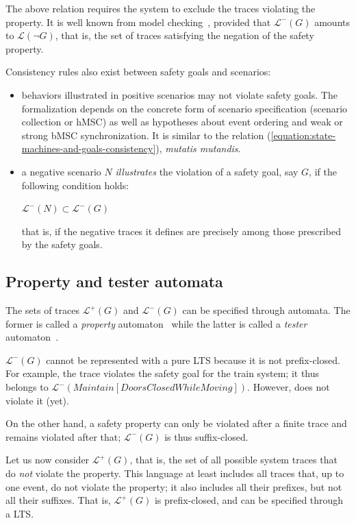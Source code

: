 The above relation requires the system to exclude the traces violating the property. It is well known from model checking~\cite{Clarke:1989}, provided that $\mathcal{L}^{-}(G)$ amounts to $\mathcal{L}(\neg G)$, that is, the set of traces satisfying the negation of the safety property. 

Consistency rules also exist between safety goals and scenarios:

\begin{itemize}
\item behaviors illustrated in positive scenarios may not violate safety goals. The formalization depends on the concrete form of scenario specification (scenario collection or hMSC) as well as hypotheses about event ordering and weak or strong bMSC synchronization. It is similar to the relation (\ref{equation:state-machines-and-goals-consistency}), \emph{mutatis mutandis}.
\item a negative scenario $N$ \emph{illustrates} the violation of a safety goal, say $G$, if the following condition holds:
\begin{center}
$\mathcal{L}^{-}(N) \subset \mathcal{L}^{-}(G)$
\end{center}
\noindent that is, if the negative traces it defines are precisely among those prescribed by the safety goals.
\end{itemize}

\subsection{Property and tester automata\label{subsection:background-property-and-tester-automata}}

The sets of traces $\mathcal{L}^{+}(G)$ and $\mathcal{L}^{-}(G)$ can be specified through automata. The former is called a \emph{property} automaton~\cite{Letier:2005, Letier:2008} while the latter is called a \emph{tester} automaton~\cite{Giannakopoulou:2003}.

$\mathcal{L}^{-}(G)$ cannot be represented with a pure LTS because it is not prefix-closed. For example, the trace  violates the safety goal for the train system; it thus belongs to $\mathcal{L}^{-}(Maintain[DoorsClosed While Moving])$. However,  does not violate it (yet). 

On the other hand, a safety property can only be violated after a finite trace and remains violated after that; $\mathcal{L}^{-}(G)$ is thus suffix-closed. 

Let us now consider $\mathcal{L}^{+}(G)$, that is, the set of all possible system traces that do \emph{not} violate the property. This language at least includes all traces that, up to one event, do not violate the property; it also includes all their prefixes, but not all their suffixes. That is, $\mathcal{L}^{+}(G)$ is prefix-closed, and can be specified through a LTS. 


